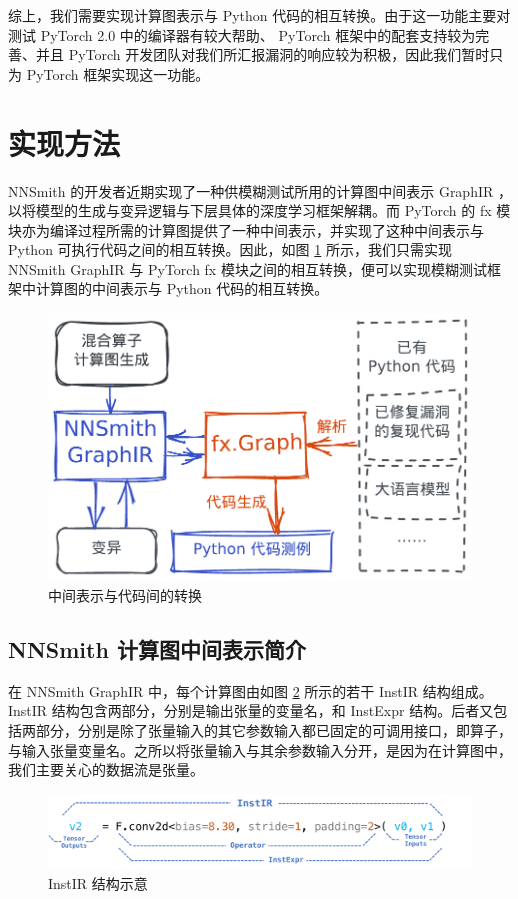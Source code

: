 综上，我们需要实现计算图表示与 Python 代码的相互转换。由于这一功能主要对测试 PyTorch 2.0 中的编译器有较大帮助、 PyTorch 框架中的配套支持较为完善、并且 PyTorch 开发团队对我们所汇报漏洞的响应较为积极，因此我们暂时只为 PyTorch 框架实现这一功能。

\section{实现方法}

NNSmith 的开发者近期实现了一种供模糊测试所用的计算图中间表示 GraphIR\cite{nnsmith_gir} ，以将模型的生成与变异逻辑与下层具体的深度学习框架解耦。而 PyTorch 的 fx 模块\cite{torch_fx}亦为编译过程所需的计算图提供了一种中间表示，并实现了这种中间表示与 Python 可执行代码之间的相互转换。因此，如图 \ref{fig:convert} 所示，我们只需实现 NNSmith GraphIR 与 PyTorch fx 模块之间的相互转换，便可以实现模糊测试框架中计算图的中间表示与 Python 代码的相互转换。

\begin{figure}
    \centering
    \includegraphics[width=.6\linewidth]{figures/convert.pdf}
    \caption{中间表示与代码间的转换}
    \label{fig:convert}
\end{figure}

\subsection{NNSmith 计算图中间表示简介}

在 NNSmith GraphIR 中，每个计算图由如图 \ref{fig:instir} 所示的若干 InstIR 结构组成。 InstIR 结构包含两部分，分别是输出张量的变量名，和 InstExpr 结构。后者又包括两部分，分别是除了张量输入的其它参数输入都已固定的可调用接口，即算子，与输入张量变量名。之所以将张量输入与其余参数输入分开，是因为在计算图中，我们主要关心的数据流是张量。

\begin{figure}
    \centering
    \includegraphics[width=1.\linewidth]{figures/instir.pdf}
    \caption{InstIR 结构示意}
    \label{fig:instir}
\end{figure}

